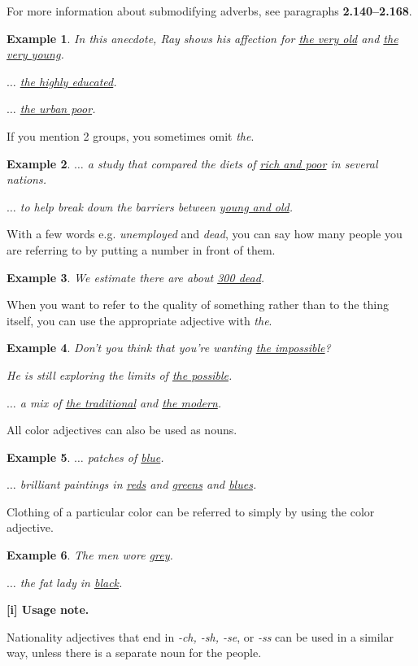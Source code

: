 \documentclass[oneside]{book}
\numberwithin{equation}{section}
\newtheorem{example}{Example}[section]
\begin{document}
For more information about submodifying adverbs, see paragraphs \textbf{2.140--2.168}.
\begin{example}
    In this anecdote, Ray shows his affection for \underline{the very old} and \underline{the very young}.
    
    $\ldots$ \underline{the highly educated}.
    
    $\ldots$ \underline{the urban poor}.
\end{example}
If you mention 2 groups, you sometimes omit \textit{the}.
\begin{example}
    $\ldots$ a study that compared the diets of \underline{rich and poor} in several nations.
    
    $\ldots$ to help break down the barriers between \underline{young and old}.
\end{example}
With a few words e.g. \textit{unemployed} and \textit{dead}, you can say how many people you are referring to by putting a number in front of them.
\begin{example}
    We estimate there are about \underline{300 dead}.
\end{example}
%
\noindent{} When you want to refer to the quality of something rather than to the thing itself, you can use the appropriate adjective with \textit{the}.
\begin{example}
    Don't you think that you're wanting \underline{the impossible}?
    
    He is still exploring the limits of \underline{the possible}.
    
    $\ldots$ a mix of \underline{the traditional} and \underline{the modern}.
\end{example}
%
\noindent{} All color adjectives can also be used as nouns.
\begin{example}
    $\ldots$ patches of \underline{blue}.
    
    $\ldots$ brilliant paintings in \underline{reds} and \underline{greens} and \underline{blues}.
\end{example}
Clothing of a particular color can be referred to simply by using the color adjective.
\begin{example}
    The men wore \underline{grey}.
    
    $\ldots$ the fat lady in \underline{black}.
\end{example}
\textbf{[i] Usage note.}

%
\noindent{} Nationality adjectives that end in \textit{-ch, -sh, -se}, or \textit{-ss} can be used in a similar way, unless there is a separate noun for the people.
\end{document}
